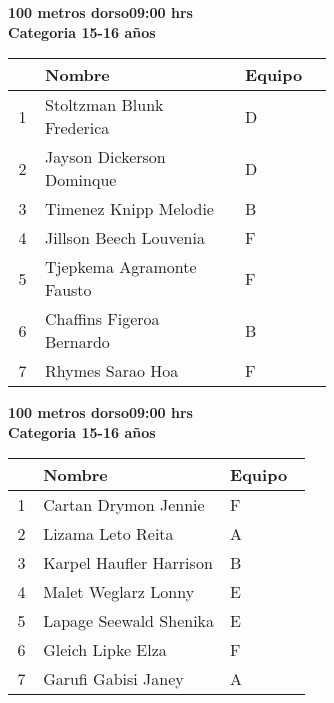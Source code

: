 \begin{minipage}{0.95\linewidth}\vspace{0.5cm} 
\begin{flushleft}
\textbf{
\hspace{-0.15cm}100 metros dorso\hspace{1.5cm}09:00 hrs \\Categoria 15-16 años}\vspace{-0.2cm} 
\end{flushleft}
\begin{tabular}{cp{0.63\linewidth}l}
\hline
& \textbf{Nombre} & \textbf{Equipo} \\ \hline
1 & Stoltzman Blunk Frederica & D \\ 
2 & Jayson Dickerson Dominque & D \\ 
3 & Timenez Knipp Melodie & B \\ 
4 & Jillson Beech Louvenia & F \\ 
5 & Tjepkema Agramonte Fausto & F \\ 
6 & Chaffins Figeroa Bernardo & B \\ 
7 & Rhymes Sarao Hoa & F \\ 
\end{tabular}
\end{minipage}
\begin{minipage}{0.95\linewidth}\vspace{0.5cm} 
\begin{flushleft}
\textbf{
\hspace{-0.15cm}100 metros dorso\hspace{1.5cm}09:00 hrs \\Categoria 15-16 años}\vspace{-0.2cm} 
\end{flushleft}
\begin{tabular}{cp{0.63\linewidth}l}
\hline
& \textbf{Nombre} & \textbf{Equipo} \\ \hline
1 & Cartan Drymon Jennie & F \\ 
2 & Lizama Leto Reita & A \\ 
3 & Karpel Haufler Harrison & B \\ 
4 & Malet Weglarz Lonny & E \\ 
5 & Lapage Seewald Shenika & E \\ 
6 & Gleich Lipke Elza & F \\ 
7 & Garufi Gabisi Janey & A \\ 
\end{tabular}
\end{minipage}
